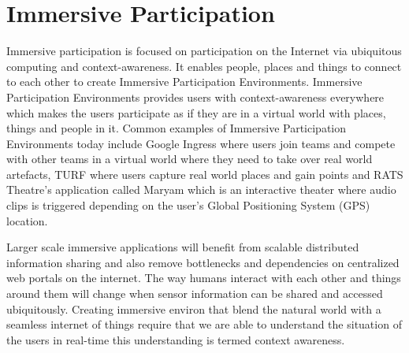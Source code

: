 \section{Immersive Participation}
Immersive participation is focused on participation on the Internet via ubiquitous computing and context-awareness. It enables people, places and things to connect to each other to create Immersive Participation Environments. Immersive Participation Environments provides users with context-awareness everywhere which makes the users participate as if they are in a virtual world with places, things and people in it. Common examples of Immersive Participation Environments today include Google Ingress \cite{ingress} where users join teams and compete with other teams in a virtual world where they need to take over real world artefacts, TURF \cite{turf} where users capture real world places and gain points and RATS Theatre's \cite{rats} application called Maryam \cite{maryam} which is an interactive theater where audio clips is triggered depending on the user's Global Positioning System (GPS) location.

Larger scale immersive applications will benefit from scalable distributed information sharing and also remove bottlenecks and dependencies on centralized web portals on the internet.
The way humans interact with each other and things around them will change when sensor information can be shared and accessed ubiquitously. Creating immersive environ that blend the natural world with a seamless internet of things require that we are able to understand the situation of the users in real-time this understanding is termed context awareness.
